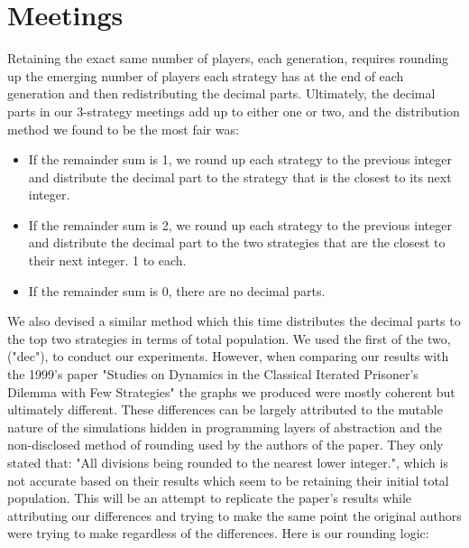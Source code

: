 
\section{Meetings}
Retaining the exact same number of players, each generation, requires rounding up the emerging number of players each strategy has at the end of each generation and then redistributing the decimal parts. Ultimately, the decimal parts in our 3-strategy meetings add up to either one or two, and the distribution method we found to be the most fair was:
\begin{itemize}
    \item If the remainder sum is 1, we round up each strategy to the previous integer and distribute the decimal part to the strategy that is the closest to its next integer.
    \item If the remainder sum is 2, we round up each strategy to the previous integer and distribute the decimal part to the two strategies that are the closest to their next integer. 1 to each.
    \item If the remainder sum is 0, there are no decimal parts.
\end{itemize}
We also devised a similar method which this time distributes the decimal parts to the top two strategies in terms of total population. We used the first of the two, ("dec"), to conduct our experiments. However, when comparing our results with the 1999's paper "Studies on Dynamics in the Classical Iterated Prisoner's Dilemma with Few Strategies" the graphs we produced were mostly coherent but ultimately different. These differences can be largely attributed to the mutable nature of the simulations hidden in programming layers of abstraction and the non-disclosed method of rounding used by the authors of the paper. They only stated that: "All divisions being rounded to the nearest lower integer.", which is not accurate based on their results which seem to be retaining their initial total population. This will be an attempt to replicate the paper's results while attributing our differences and trying to make the same point the original authors were trying to make regardless of the differences. Here is our rounding logic: 
